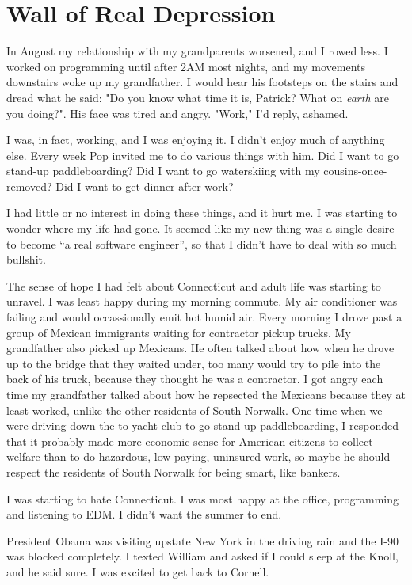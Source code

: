 \documentclass[12pt]{article}
\begin{document}
\section{Wall of Real Depression}
In August my relationship with my grandparents worsened, and I rowed less.  I
worked on programming until after 2AM most nights, and my movements downstairs
woke up my grandfather.  I would hear his footsteps on the stairs and dread what
he said: "Do you know what time it is, Patrick?  What on \textit{earth} are you
doing?".  His face was tired and angry. "Work," I'd reply, ashamed.

I was, in fact, working, and I was enjoying it.  I didn't enjoy much of anything
else.  Every week Pop invited me to do various things with him.  Did I want to
go stand-up paddleboarding?  Did I want to go waterskiing with my cousins-once-
removed?  Did I want to get dinner after work?  

I had little or no interest in doing these things, and it hurt me.  I was
starting to wonder where my life had gone.  It seemed like my new thing was
a single desire to become ``a real software engineer'', so that I didn't have to
deal with so much bullshit.  

The sense of hope I had felt about Connecticut and adult life was starting to
unravel.  I was least happy during my morning commute.  My air conditioner was
failing and would occassionally emit hot humid air.  Every morning I drove past
a group of Mexican immigrants waiting for contractor pickup trucks.  My
grandfather also picked up Mexicans.  He often talked about how when he drove up
to the bridge that they waited under, too many would try to pile into the back
of his truck, because they thought he was a contractor.  I got angry each time
my grandfather talked about how he repsected the Mexicans because they at least
worked, unlike the other residents of South Norwalk.  One time when we were
driving down the to yacht club to go stand-up paddleboarding, I responded that
it probably made more economic sense for American citizens to collect welfare
than to do hazardous, low-paying, uninsured work, so maybe he should respect the
residents of South Norwalk for being smart, like bankers. 

I was starting to hate Connecticut.  I was most happy at the office, programming
and listening to EDM.  I didn't want the summer to end.

President Obama was visiting upstate New York in the driving rain and the I-90
was blocked completely.  I texted William and asked if I could sleep at the
Knoll, and he said sure.  I was excited to get back to Cornell.
\end{document}
